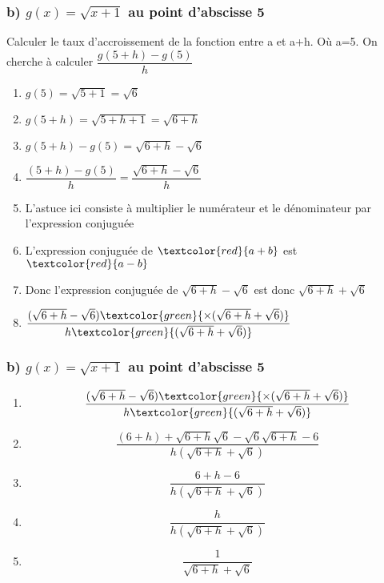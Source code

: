 \documentclass[t]{beamer}
\begin{document}
	\begin{frame}
		\frametitle{b) $g(x) = \sqrt{x+1}$ au point d'abscisse 5}
		\pause
		Calculer le taux d'accroissement de la fonction entre a et a+h. \pause Où a=5.
		\pause
		On cherche à calculer \( \dfrac{g(5+h) - g(5)}{h} \)
		\pause
		\begin{enumerate}[]
			\item<+-> \(g(5) = \sqrt{5+1} = \sqrt{6} \)
			\item<+-> \(g(5+h) = \sqrt{5+h+1} = \sqrt{6+h} \)
			\item<+-> \(g(5+h) - g(5) = \sqrt{6+h} - \sqrt{6} \)
			\item<+-> \( \dfrac{(5+h) - g(5)}{h} = \dfrac{\sqrt{6+h} - \sqrt{6}}{h} \)
			\item<+-> L'astuce ici consiste à multiplier le numérateur et le dénominateur par \color{red}l'expression conjuguée
			\item<+-> L'expression conjuguée de $\textcolor{red}{a+b}$ est $\textcolor{red}{a-b}$
			\item<+-> Donc l'expression conjuguée de $\sqrt{6+h} - \sqrt{6}$ est donc $\sqrt{6+h} + \sqrt{6}$
			\item<+-> \(\dfrac{(\sqrt{6+h} - \sqrt{6}) \textcolor{green}{\times (\sqrt{6+h} + \sqrt{6})}}{h \textcolor{green}{(\sqrt{6+h} + \sqrt{6})}}\)
		\end{enumerate}
	\end{frame}

	\begin{frame}[label=pagebanale]
		\frametitle{b) $g(x) = \sqrt{x+1}$ au point d'abscisse 5}
		\pause
		\begin{enumerate}[]
			\item<+-> \[\dfrac{(\sqrt{6+h} - \sqrt{6}) \textcolor{green}{\times (\sqrt{6+h} + \sqrt{6})}}{h \textcolor{green}{(\sqrt{6+h} + \sqrt{6})}}\]
			\item<+-> \[\dfrac{(6+h) + \sqrt{6+h}\sqrt{6} - \sqrt{6}\sqrt{6+h} - 6}{h (\sqrt{6+h} + \sqrt{6})} \]
			\item<+-> \[\dfrac{6+h - 6}{h (\sqrt{6+h} + \sqrt{6})} \]
			\item<+-> \[\dfrac{h}{h (\sqrt{6+h} + \sqrt{6})} \]
			\item<+-> \[\dfrac{1}{\sqrt{6+h} + \sqrt{6}} \]
		\end{enumerate}
	\end{frame}
\end{document}
